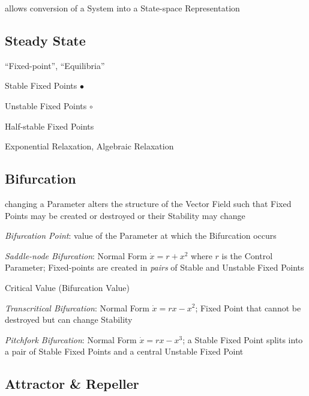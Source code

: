 allows conversion of a System into a State-space Representation



\subsection{Steady State}\label{sec:steady_state}

``Fixed-point'', ``Equilibria'' %

Stable Fixed Points $\bullet$

Unstable Fixed Points $\circ$

Half-stable Fixed Points

Exponential Relaxation, Algebraic Relaxation



\subsection{Bifurcation}\label{sec:bifurcation}

changing a Parameter alters the structure of the Vector Field such that Fixed
Points may be created or destroyed or their Stability may change

\emph{Bifurcation Point}: value of the Parameter at which the Bifurcation
occurs

\emph{Saddle-node Bifurcation}: Normal Form $\dot{x} = r + x^2$ where $r$ is
the Control Parameter;
Fixed-points are created in \emph{pairs} of Stable and Unstable Fixed Points


Critical Value (Bifurcation Value)

\emph{Transcritical Bifurcation}: Normal Form $\dot{x} = rx - x^2$; Fixed Point
that cannot be destroyed but can change Stability

\emph{Pitchfork Bifurcation}: Normal Form $\dot{x} = rx - x^3$; a Stable Fixed
Point splits into a pair of Stable Fixed Points and a central Unstable Fixed
Point



\subsection{Attractor \& Repeller}\label{sec:attractor_repeller}

